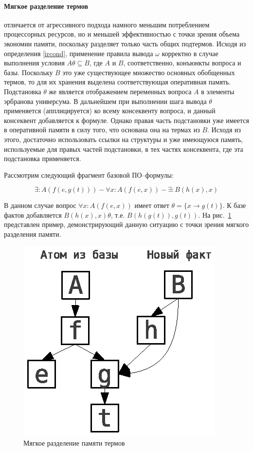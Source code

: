 \paragraph{Мягкое разделение термов} отличается от агрессивного подхода намного меньшим потреблением процессорных ресурсов, но и меньшей эффективностью с точки зрения объема экономии памяти, поскольку разделяет только часть общих подтермов. Исходя из определения \ref{ircond}, применение правила вывода $\omega$ корректно в случае выполнения условия $A\theta \subseteq B$, где $A$ и $B$, соответственно, конъюнкты вопроса и базы. Поскольку $B$ это уже существующее множество основных обобщенных термов, то для их хранения выделена соответствующая оперативная память. Подстановка $\theta$ же является отображением переменных вопроса $A$ в элементы эрбранова универсума. В дальнейшем при выполнении шага вывода $\theta$ применяется (апплицируется) ко всему консеквенту вопроса, и данный консеквент добавляется к формуле. Однако правая часть подстановки уже имеется в оперативной памяти в силу того, что основана она на термах из $B$. Исходя из этого, достаточно использовать ссылки на структуры и уже имеющуюся память, используемые для правых частей подстановки, в тех частях консеквента, где эта подстановка применяется.

Рассмотрим следующий фрагмент базовой ПО--формулы:

$$ \exists:A(f(e,g(t))) - \forall x:A(f(e,x)) - \exists:B(h(x),x) $$

В данном случае вопрос $\forall x:A(f(e,x))$ имеет ответ $\theta = \{x \rightarrow g(t)\}$. К базе фактов добавляется $B(h(x),x)\theta$, т.е. $B(h(g(t)),g(t))$. На рис.~\ref{fig:datasharing1} представлен пример, демонстрирующий данную ситуацию с точки зрения мягкого разделения памяти.
\begin{figure}[h]
	\centering
	\includegraphics[width=0.3\linewidth]{pics/DataSharing1.eps}
	\caption{Мягкое разделение памяти термов}
	\label{fig:datasharing1}
\end{figure}

